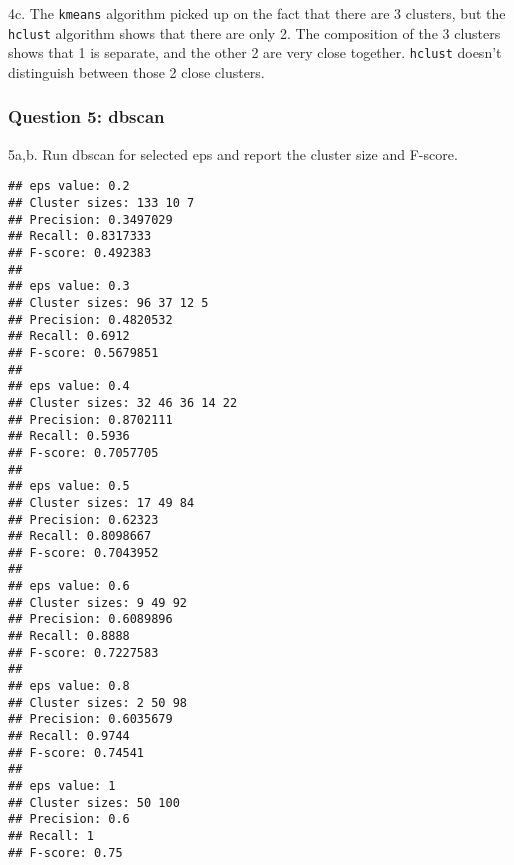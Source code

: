 \documentclass[]{article}
\newenvironment{Shaded}{\begin{snugshade}}{\end{snugshade}}
\newcommand{\KeywordTok}[1]{\textcolor[rgb]{0.13,0.29,0.53}{\textbf{#1}}}
\newcommand{\DecValTok}[1]{\textcolor[rgb]{0.00,0.00,0.81}{#1}}
\newcommand{\FloatTok}[1]{\textcolor[rgb]{0.00,0.00,0.81}{#1}}
\newcommand{\CharTok}[1]{\textcolor[rgb]{0.31,0.60,0.02}{#1}}
\newcommand{\StringTok}[1]{\textcolor[rgb]{0.31,0.60,0.02}{#1}}
\newcommand{\ControlFlowTok}[1]{\textcolor[rgb]{0.13,0.29,0.53}{\textbf{#1}}}
\newcommand{\OperatorTok}[1]{\textcolor[rgb]{0.81,0.36,0.00}{\textbf{#1}}}
\newcommand{\NormalTok}[1]{#1}
\begin{document}
4c. The \texttt{kmeans} algorithm picked up on the fact that there are 3
clusters, but the \texttt{hclust} algorithm shows that there are only 2.
The composition of the 3 clusters shows that 1 is separate, and the
other 2 are very close together. \texttt{hclust} doesn't distinguish
between those 2 close clusters.

\subsubsection{Question 5: dbscan}\label{question-5-dbscan}

5a,b. Run dbscan for selected eps and report the cluster size and
F-score.

\begin{Shaded}
\end{Shaded}

\begin{verbatim}
## eps value: 0.2
## Cluster sizes: 133 10 7
## Precision: 0.3497029
## Recall: 0.8317333
## F-score: 0.492383
## 
## eps value: 0.3
## Cluster sizes: 96 37 12 5
## Precision: 0.4820532
## Recall: 0.6912
## F-score: 0.5679851
## 
## eps value: 0.4
## Cluster sizes: 32 46 36 14 22
## Precision: 0.8702111
## Recall: 0.5936
## F-score: 0.7057705
## 
## eps value: 0.5
## Cluster sizes: 17 49 84
## Precision: 0.62323
## Recall: 0.8098667
## F-score: 0.7043952
## 
## eps value: 0.6
## Cluster sizes: 9 49 92
## Precision: 0.6089896
## Recall: 0.8888
## F-score: 0.7227583
## 
## eps value: 0.8
## Cluster sizes: 2 50 98
## Precision: 0.6035679
## Recall: 0.9744
## F-score: 0.74541
## 
## eps value: 1
## Cluster sizes: 50 100
## Precision: 0.6
## Recall: 1
## F-score: 0.75
\end{verbatim}
\end{document}
